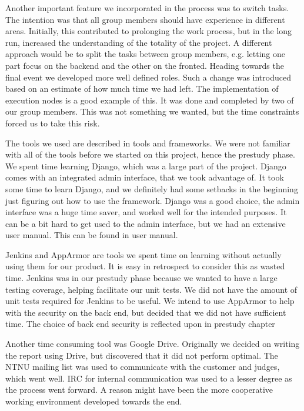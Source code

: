 Another important feature we incorporated in the process was to switch
tasks. The intention was that all group members should have experience
in different areas. Initially, this contributed to prolonging the work
process, but in the long run, increased the understanding of the
totality of the project. A different approach would be to split the
tasks between group members, e.g. letting one part focus on the backend
and the other on the fronted. Heading towards the final event we
developed more well defined roles. Such a change was introduced based
on an estimate of how much time we had left. The implementation of
execution nodes is a good example of this. It was done and completed by
two of our group members. This was not something we wanted, but the
time constraints forced us to take this risk. 

The tools we used are described in tools and frameworks. We were not
familiar with all of the tools before we started on this project, hence
the prestudy phase. We spent time learning Django, which was a large
part of the project. Django comes with an integrated admin interface,
that we took advantage of. It took some time to learn Django, and we
definitely had some setbacks in the beginning just figuring out how to
use the framework. Django was a good choice, the admin interface was a
huge time saver, and worked well for the intended purposes. It can be a
bit hard to get used to the admin interface, but we had an extensive
user manual. This can be found in user manual.

Jenkins and AppArmor are tools we spent time on learning without
actually using them for our product. It is easy in retrospect to
consider this as wasted time. Jenkins was in our prestudy phase because
we wanted to have a large testing coverage, helping facilitate our unit
tests. We did not have the amount of unit tests required for Jenkins to
be useful. We intend to use AppArmor to help with the security on the
back end, but decided that we did not have sufficient time. The choice
of back end security is reflected upon in prestudy chapter

Another time consuming tool was Google Drive. Originally we decided on
writing the report using Drive, but discovered that it did not perform
optimal. The NTNU mailing list was used to communicate with the
customer and judges, which went well. IRC for internal communication
was used to a lesser degree as the process went forward. A reason might
have been the more cooperative working environment developed towards
the end. \ 

